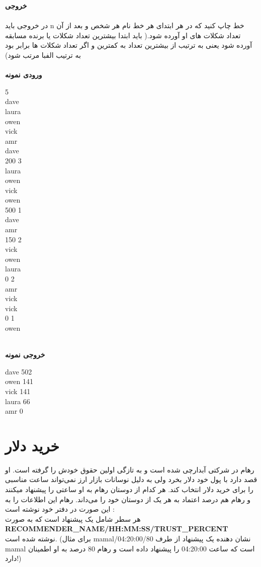 \documentclass[]{article}
\newcommand{\inputsample}[1]{
    ~\\
    \textbf{ورودی نمونه}
    ~\\
    \begin{tcolorbox}[breakable,boxrule=0pt]
        \begin{latin}
            \large{
                #1
            }
        \end{latin}
    \end{tcolorbox}
}
\newcommand{\outputsample}[1]{
    ~\\
    \textbf{خروجی نمونه}

    \begin{tcolorbox}[breakable,boxrule=0pt]
        \begin{latin}
            \large{
                #1
            }
        \end{latin}
    \end{tcolorbox}
}
\begin{document}
\newpage
\textbf{خروجی}\\
\\
در خروجی باید n خط چاپ کنید که در هر ابتدای هر خط نام هر شخص و بعد از آن تعداد شکلات های او آورده شود.( باید ابتدا بیشترین تعداد شکلات یا برنده مسابقه آورده شود یعنی به ترتیب از بیشترین تعداد به کمترین و اگر تعداد شکلات ها برابر بود به ترتیب الفبا مرتب شود)\\

\inputsample{
5\\
dave\\
laura\\
owen\\
vick\\
amr\\
dave\\
200 3\\
laura\\
owen\\
vick\\
owen\\
500 1\\
dave\\
amr\\
150 2\\
vick\\
owen\\
laura\\
0 2\\
amr\\
vick\\
vick\\
0 1\\
owen
}
\outputsample{
dave 502\\
owen 141\\
vick 141\\
laura 66\\
amr 0
}

\newpage
\section{خرید دلار}


رهام در شرکتی آبدارچی شده است و به تازگی اولین حقوق خودش را گرفته است.
 او قصد دارد با پول خود دلار بخرد ولی به دلیل نوسانات بازار ارز نمی‌تواند ساعت مناسبی را برای خرید دلار انتخاب کند.
  هر کدام از دوستان رهام به او ساعتی را پیشنهاد میکنند و رهام هم درصد اعتماد به هر یک از دوستان خود را می‌داند.
رهام این اطلاعات را به این صورت در دفتر خود نوشته است : 
\\
هر سطر شامل یک پیشنهاد است که به صورت \\
\textbf{RECOMMENDER\_NAME/HH:MM:SS/TRUST\_PERCENT}\\
نوشته شده است. (برای مثال 
mamal/04:20:00/80
نشان دهنده یک پیشنهاد از طرف 
mamal
است که ساعت 
04:20:00
را پیشنهاد داده است و رهام 80 درصد به او اطمینان دارد!)
\end{document}
